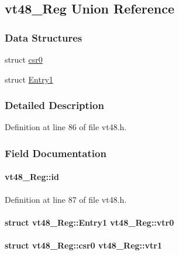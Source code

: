 \subsection{vt48\_\-Reg Union Reference}
\label{unionvt48__Reg}
\subsubsection*{Data Structures}
\begin{DoxyCompactItemize}
\item 
struct \hyperlink{structvt48__Reg_1_1csr0}{csr0}
\item 
struct \hyperlink{structvt48__Reg_1_1Entry1}{Entry1}
\end{DoxyCompactItemize}


\subsubsection{Detailed Description}


Definition at line 86 of file vt48.h.

\subsubsection{Field Documentation}
\paragraph[{id}]{ {\bf vt48\_\-Reg::id}}\hfill\label{unionvt48__Reg_ade329feaa181aa8123a555d20884f306}


Definition at line 87 of file vt48.h.
\paragraph[{vtr0}]{\setlength{\rightskip}{0pt plus 5cm}struct {\bf vt48\_\-Reg::Entry1}  {\bf vt48\_\-Reg::vtr0}}\hfill\label{unionvt48__Reg_a38806d7ff89ca85235d33f4dc8d717ac}
\paragraph[{vtr1}]{\setlength{\rightskip}{0pt plus 5cm}struct {\bf vt48\_\-Reg::csr0}  {\bf vt48\_\-Reg::vtr1}}\hfill\label{unionvt48__Reg_a9665816960237b9c656a1f750f47c852}

